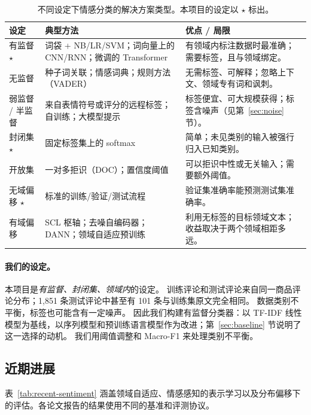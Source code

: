 \documentclass[11pt,a4paper]{article}
\begin{document}
\begin{table}[!htbp]
\centering
\caption{不同设定下情感分类的解决方案类型。本项目的设定以 $\star$ 标出。}
\label{tab:a1-settings}
\small
\begin{tabularx}{\textwidth}{l Y Y}
\toprule
设定 & 典型方法 & 优点 / 局限 \\
\midrule
有监督 $\star$ & 词袋 + NB/LR/SVM；词向量上的 CNN/RNN；微调的 Transformer\cite{devlin2019bert} & 有领域内标注数据时最准确；需要标签，且与领域绑定。 \\
无监督 & 种子词关联；情感词典；规则方法（VADER） & 无需标签、可解释；忽略上下文、领域专有词和讽刺。 \\
弱监督 / 半监督 & 来自表情符号或评分的远程标签；自训练；大模型提示\cite{zhang2023sentiment} & 标签便宜、可大规模获得；标签含噪声（见第~\ref{sec:noise} 节）。 \\
\midrule
封闭集 $\star$ & 固定标签集上的 softmax & 简单；未见类别的输入被强行归入已知类别。 \\
开放集 & 一对多拒识（DOC）；置信度阈值 & 可以拒识中性或无关输入；需要额外阈值。 \\
\midrule
无域偏移 $\star$ & 标准的训练/验证/测试流程 & 验证集准确率能预测测试集准确率。 \\
有域偏移 & SCL 枢轴\cite{blitzer2007biographies}；去噪自编码器；DANN；领域自适应预训练 & 利用无标签的目标领域文本；收益取决于两个领域相距多远。 \\
\bottomrule
\end{tabularx}
\end{table}

\paragraph{我们的设定。}
本项目是\emph{有监督、封闭集、领域内}的设定。
训练评论和测试评论来自同一商品评论分布；1{,}851 条测试评论中甚至有 101 条与训练集原文完全相同。
数据类别不平衡，标签也可能含有一定噪声。
因此我们构建有监督分类器：以 TF-IDF 线性模型为基线，以序列模型和预训练语言模型作为改进；第~\ref{sec:baseline} 节说明了这一选择的动机。
我们用阈值调整和 Macro-F1 来处理类别不平衡。

\subsection{近期进展}\label{sec:recent}
表~\ref{tab:recent-sentiment} 涵盖领域自适应、情感感知的表示学习以及分布偏移下的评估。各论文报告的结果使用不同的基准和评测协议。
\end{document}
